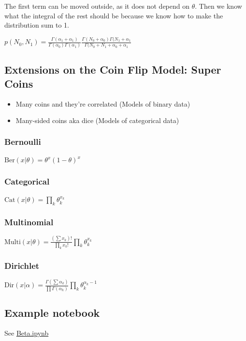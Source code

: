 \documentclass{article}
\begin{document}
The first term can be moved outside, as it does not depend on $\theta$. Then we know what the integral of the rest should be because we know how to make the distribution sum to 1.

$p(N_0, N_1) = \frac{\Gamma( \alpha_1 +  \alpha_1)}{\Gamma(\alpha_0)\Gamma(\alpha_1)} \frac{\Gamma(N_0 + \alpha_0)\Gamma(N_1 + \alpha_1}{\Gamma(N_0 + N_1 + \alpha_0 + \alpha_1}$

\subsection{Extensions on the Coin Flip Model: Super Coins}
\begin{itemize}
\item Many coins and they're correlated (Models of binary data)
\item Many-sided coins aka dice (Models of categorical data)
\end{itemize}

\subsubsection*{Bernoulli}
$\textrm{Ber}(x|\theta) = \theta^{x}(1-\theta)^x$
\subsubsection*{Categorical}
$\textrm{Cat}(x|\theta) = \prod_k\theta_k^{x_k}$
\subsubsection*{Multinomial}
$\textrm{Multi}(x|\theta) = \frac{(\sum x_k) !}{\prod_k x_k!}\prod_k\theta_k^{x_k}$
\subsubsection*{Dirichlet}
$\textrm{Dir}(x|\alpha) = \frac{\Gamma(\sum \alpha_k)}{\prod \Gamma(\alpha_k)}\prod_k\theta_k^{\alpha_k-1}$

\subsection{Example notebook}
See \href{https://github.com/harvard-ml-courses/cs281-demos/blob/master/Beta.ipynb}{Beta.ipynb}
\end{document}
